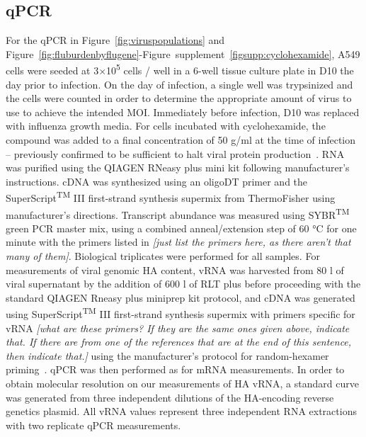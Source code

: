 \documentclass[9pt,lineno]{elife}
\newcommand{\jdbcomment}[1]{\emph{\color{red} [#1]}}
\begin{document}
\subsection{qPCR}
For the qPCR in Figure~\ref{fig:viruspopulations} and Figure~\ref{fig:fluburdenbyflugene}-Figure~supplement~\ref{figsupp:cyclohexamide}, A549 cells were seeded at 3$\times$10\textsuperscript{5} cells / well in a 6-well tissue culture plate in D10 the day prior to infection. 
On the day of infection, a single well was trypsinized and the cells were counted in order to determine the appropriate amount of virus to use to achieve the intended MOI.
Immediately before infection, D10 was replaced with influenza growth media.
For cells incubated with cyclohexamide, the compound was added to a final concentration of 50  \si{\micro}g/ml at the time of infection -- previously confirmed to be sufficient to halt viral protein production~\citep{Killip:2014kz}.
RNA was purified using the QIAGEN RNeasy plus mini kit following manufacturer's instructions. 
cDNA was synthesized using an oligoDT primer and the SuperScript\textsuperscript{TM} III first-strand synthesis supermix from ThermoFisher using manufacturer's directions. 
Transcript abundance was measured using SYBR\textsuperscript{TM} green PCR master mix, using a combined anneal/extension step of 60 \si{\degreeCelsius } for one minute with the primers listed in \jdbcomment{just list the primers here, as there aren't that many of them}.
Biological triplicates were performed for all samples.
For measurements of viral genomic HA content, vRNA was harvested from 80 \si{\micro}l of viral supernatant by the addition of 600 \si{\micro}l of RLT plus before proceeding with the standard QIAGEN Rneasy plus miniprep kit protocol, and cDNA was generated using  SuperScript\textsuperscript{TM} III first-strand synthesis supermix with primers specific for vRNA \jdbcomment{what are these primers? If they are the same ones given above, indicate that. If there are from one of the references that are at the end of this sentence, then indicate that.} using the manufacturer's protocol for random-hexamer priming~\citep{Xue:2017dl,Hoffmann:2001vj}.
qPCR was then performed as for mRNA measurements.
In order to obtain molecular resolution on our measurements of HA vRNA, a standard curve was generated from three independent dilutions of the HA-encoding reverse genetics plasmid. 
All vRNA values represent three independent RNA extractions with two replicate qPCR measurements. 
\end{document}
